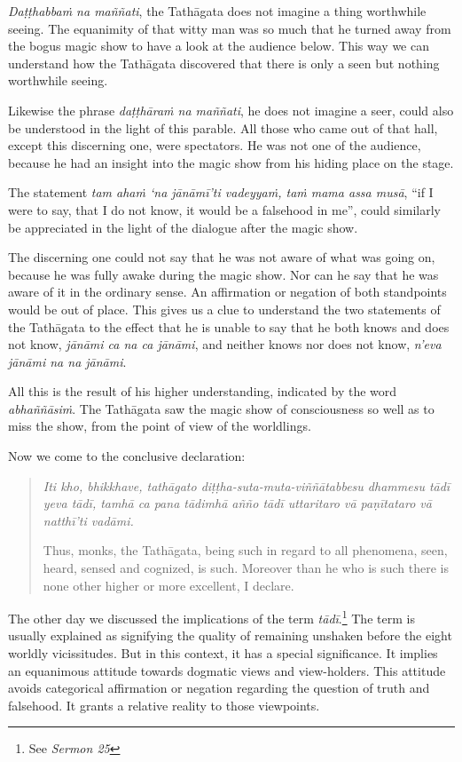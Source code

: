 \emph{Daṭṭhabbaṁ na maññati}, the Tathāgata does not imagine a thing worthwhile seeing. The equanimity of that witty man was so much that he turned away from the bogus magic show to have a look at the audience below. This way we can understand how the Tathāgata discovered that there is only a seen but nothing worthwhile seeing.

Likewise the phrase \emph{daṭṭhāraṁ na maññati}, he does not imagine a seer, could also be understood in the light of this parable. All those who came out of that hall, except this discerning one, were spectators. He was not one of the audience, because he had an insight into the magic show from his hiding place on the stage.

The statement \emph{tam ahaṁ `na jānāmī'ti vadeyyaṁ, taṁ mama assa musā}, ``if I were to say, that I do not know, it would be a falsehood in me'', could similarly be appreciated in the light of the dialogue after the magic show.

The discerning one could not say that he was not aware of what was going on, because he was fully awake during the magic show. Nor can he say that he was aware of it in the ordinary sense. An affirmation or negation of both standpoints would be out of place. This gives us a clue to understand the two statements of the Tathāgata to the effect that he is unable to say that he both knows and does not know, \emph{jānāmi ca na ca jānāmi}, and neither knows nor does not know, \emph{n'eva jānāmi na na jānāmi}.

All this is the result of his higher understanding, indicated by the word \emph{abhaññāsiṁ}. The Tathāgata saw the magic show of consciousness so well as to miss the show, from the point of view of the worldlings.

Now we come to the conclusive declaration:

\begin{quote}
\emph{Iti kho, bhikkhave, tathāgato diṭṭha-suta-muta-viññātabbesu dhammesu tādī yeva tādī, tamhā ca pana tādimhā añño tādī uttaritaro vā paṇītataro vā natthī'ti vadāmi.}

Thus, monks, the Tathāgata, being such in regard to all phenomena, seen, heard, sensed and cognized, is such. Moreover than he who is such there is none other higher or more excellent, I declare.
\end{quote}

The other day we discussed the implications of the term \emph{tādī}.\footnote{See \emph{Sermon 25}} The term is usually explained as signifying the quality of remaining unshaken before the eight worldly vicissitudes. But in this context, it has a special significance. It implies an equanimous attitude towards dogmatic views and view-holders. This attitude avoids categorical affirmation or negation regarding the question of truth and falsehood. It grants a relative reality to those viewpoints.

